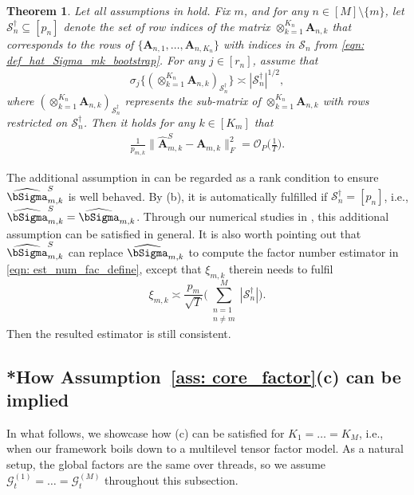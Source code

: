 \documentclass[aos]{imsart}
\theoremstyle{plain}
\newtheorem{theorem}{Theorem}[section]
\theoremstyle{definition}
\def\wh#1{\widehat{#1}}
\def\cG{\mathcal{G}} \def\cH{\boldsymbol{\mathcal{H}}} \def\cI{\mathcal{I}}
\def\cO{\mathcal{O}}
\def\cS{\mathcal{S}}
\def\bA{\mathbf{A}}
\begin{document}
\begin{theorem}
\label{prop: global_loading_bootstrap}
Let all assumptions in  hold. Fix $m$, and for any $n\in[M] \setminus\{m\}$, let $\cS_n^\dagger \subseteq [p_n]$ denote the set of row indices of the matrix $\otimes_{k=1}^{K_n} \bA_{n,k}$ that corresponds to the rows of $\{\bA_{n,1}, \dots, \bA_{n,K_n}\}$ with indices in $\cS_n$ from \eqref{eqn: def_hat_Sigma_mk_bootstrap}. For any $j\in[r_n]$, assume that
\[
\sigma_{j}\big\{ (\otimes_{k=1}^{K_n} \bA_{n,k} )_{\cS_n^\dagger} \big\} \asymp |\cS_n^\dagger |^{1/2} ,
\]
where $(\otimes_{k=1}^{K_n} \bA_{n,k} )_{\cS_n^\dagger}$ represents the sub-matrix of $\otimes_{k=1}^{K_n} \bA_{n,k}$ with rows restricted on $\cS_n^\dagger$. Then it holds for any $k\in[K_m]$ that
\begin{align*}
    \frac{1}{p_{m,k}} \Big\| \wh{\bA}_{m,k}^S -\bA_{m,k} \Big\|_F^2 = \cO_P\Big( \frac{1}{T} \Big) .
\end{align*}
\end{theorem}


The additional assumption in  can be regarded as a rank condition to ensure $\wh\bSigma_{m,k}^S$ is well behaved. By (b), it is automatically fulfilled if $\cS_n^\dagger =[p_n]$, i.e., $\wh\bSigma_{m,k}^S =\wh\bSigma_{m,k}$. Through our numerical studies in , this additional assumption can be satisfied in general. It is also worth pointing out that $\wh\bSigma_{m,k}^S$ can replace $\wh\bSigma_{m,k}$ to compute the factor number estimator in \eqref{eqn: est_num_fac_define}, except that $\xi_{m,k}$ therein needs to fulfil
\[
\xi_{m,k} \asymp \frac{p_m}{\sqrt{T}} \Bigg( \sum_{\substack{n=1\\ n\neq m}}^M |\cS_n^\dagger | \Bigg) .
\]
Then the resulted estimator is still consistent.





\subsection{*How Assumption~\ref{ass: core_factor}(c) can be implied}
\label{subsec: assump_fac_satisfied}

In what follows, we showcase how (c) can be satisfied for $K_1=\dots=K_M$, i.e., when our framework boils down to a multilevel tensor factor model. As a natural setup, the global factors are the same over threads, so we assume $\cG_t^{(1)} = \dots =\cG_t^{(M)}$ throughout this subsection.
\end{document}
